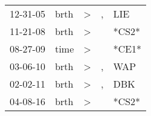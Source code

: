 \begin{supertabular}{lllll}
 12-31-05 &  brth &  \textgreater &  , &    LIE \\
 11-21-08 &  brth &  \textgreater &    &  *CS2* \\
 08-27-09 &  time &  \textgreater &    &  *CE1* \\
 03-06-10 &  brth &  \textgreater &  , &    WAP \\
 02-02-11 &  brth &  \textgreater &  , &    DBK \\
 04-08-16 &  brth &  \textgreater &    &  *CS2* \\
\end{supertabular}
